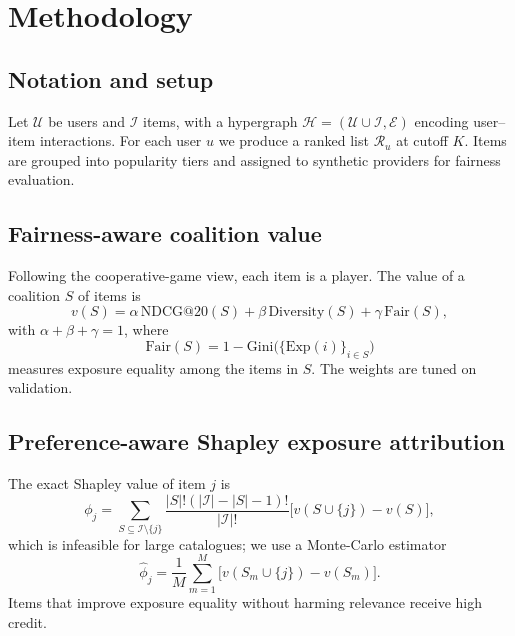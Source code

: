 \documentclass[pdflatex,sn-mathphys-num]{sn-jnl}%
\makeatletter
\theoremstyle{thmstyleone}%
\theoremstyle{thmstyletwo}%
\theoremstyle{thmstylethree}%
\newcommand{\fair}{\mathrm{Fair}}
\newcommand{\NDCG}{\mathrm{NDCG@20}}
\newcommand{\Gini}{\mathrm{Gini}}
\makeatother
\begin{document}
\section{Methodology}\label{sec3}

\subsection{Notation and setup}
Let $\mathcal{U}$ be users and $\mathcal{I}$ items, with a hypergraph $\mathcal{H}=(\mathcal{U}\cup\mathcal{I},\mathcal{E})$ encoding user--item interactions. For each user $u$ we produce a ranked list $\mathcal{R}_u$ at cutoff $K$. Items are grouped into popularity tiers and assigned to synthetic providers for fairness evaluation.

\subsection{Fairness-aware coalition value}
Following the cooperative-game view, each item is a player. The value of a coalition $S$ of items is
\begin{equation}\label{eq:value}
v(S)=\alpha\,\NDCG{}(S)+\beta\,\mathrm{Diversity}(S)+\gamma\,\fair(S),
\end{equation}
with $\alpha+\beta+\gamma=1$, where
\begin{equation}\label{eq:fair}
\fair(S)=1-\Gini\bigl(\{\mathrm{Exp}(i)\}_{i\in S}\bigr)
\end{equation}
measures exposure equality among the items in $S$. The weights are tuned on validation.

\subsection{Preference-aware Shapley exposure attribution}
The exact Shapley value of item $j$ is
\begin{equation}\label{eq:shapley}
\phi_j=\sum_{S\subseteq\mathcal{I}\setminus\{j\}}\frac{|S|!(|\mathcal{I}|-|S|-1)!}{|\mathcal{I}|!}\bigl[v(S\cup\{j\})-v(S)\bigr],
\end{equation}
which is infeasible for large catalogues; we use a Monte-Carlo estimator
\begin{equation}\label{eq:mc}
\hat{\phi}_j=\frac{1}{M}\sum_{m=1}^{M}\bigl[v(S_m\cup\{j\})-v(S_m)\bigr].
\end{equation}
Items that improve exposure equality without harming relevance receive high credit.
\end{document}
